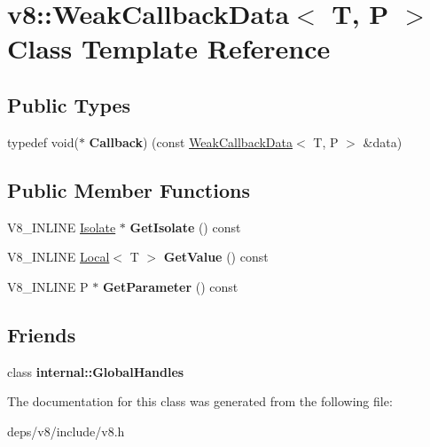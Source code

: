 \hypertarget{classv8_1_1_weak_callback_data}{}\section{v8\+:\+:Weak\+Callback\+Data$<$ T, P $>$ Class Template Reference}
\label{classv8_1_1_weak_callback_data}
\subsection*{Public Types}
\begin{DoxyCompactItemize}
\item 
\hypertarget{classv8_1_1_weak_callback_data_a08a29122f54c663fc2442d8f42c08ac2}{}typedef void($\ast$ {\bfseries Callback}) (const \hyperlink{classv8_1_1_weak_callback_data}{Weak\+Callback\+Data}$<$ T, P $>$ \&data)\label{classv8_1_1_weak_callback_data_a08a29122f54c663fc2442d8f42c08ac2}

\end{DoxyCompactItemize}
\subsection*{Public Member Functions}
\begin{DoxyCompactItemize}
\item 
\hypertarget{classv8_1_1_weak_callback_data_a499a971756182b5b52c28e506339c6b9}{}V8\+\_\+\+I\+N\+L\+I\+N\+E \hyperlink{classv8_1_1_isolate}{Isolate} $\ast$ {\bfseries Get\+Isolate} () const \label{classv8_1_1_weak_callback_data_a499a971756182b5b52c28e506339c6b9}

\item 
\hypertarget{classv8_1_1_weak_callback_data_a0e8fcf0091132c96d548ac319284710a}{}V8\+\_\+\+I\+N\+L\+I\+N\+E \hyperlink{classv8_1_1_local}{Local}$<$ T $>$ {\bfseries Get\+Value} () const \label{classv8_1_1_weak_callback_data_a0e8fcf0091132c96d548ac319284710a}

\item 
\hypertarget{classv8_1_1_weak_callback_data_a96ce7e1fbbfd56d0709225623517ff17}{}V8\+\_\+\+I\+N\+L\+I\+N\+E P $\ast$ {\bfseries Get\+Parameter} () const \label{classv8_1_1_weak_callback_data_a96ce7e1fbbfd56d0709225623517ff17}

\end{DoxyCompactItemize}
\subsection*{Friends}
\begin{DoxyCompactItemize}
\item 
\hypertarget{classv8_1_1_weak_callback_data_af107d8c7663669a5fd39ab41cf5ead03}{}class {\bfseries internal\+::\+Global\+Handles}\label{classv8_1_1_weak_callback_data_af107d8c7663669a5fd39ab41cf5ead03}

\end{DoxyCompactItemize}


The documentation for this class was generated from the following file\+:\begin{DoxyCompactItemize}
\item 
deps/v8/include/v8.\+h\end{DoxyCompactItemize}
